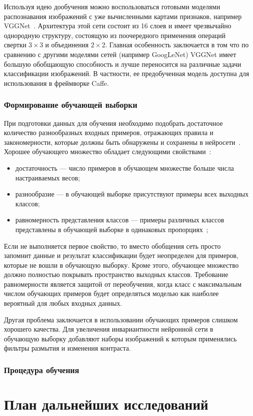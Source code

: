 \documentclass[a4paper,14pt]{extarticle} %
\begin{document}
Используя идею дообучения можно воспользоваться готовыми моделями распознавания изображений с уже вычисленными картами признаков, например VGGNet~\cite{VGGNet}. Архитектура этой сети состоит из 16 слоев и имеет чрезвычайно однородную структуру, состоящую из поочередного применения операций свертки $3 \times 3$ и объединения $2 \times 2$. Главная особенность заключается в том что по сравнению с другими моделями сетей (например GoogLeNet) VGGNet имеет большую обобщающую способность и лучше переносится на различные задачи классификации изображений. В частности, ее предобученная модель доступна для использования в фреймворке Caffe.

\subsubsection{Формирование обучающей выборки}
\hspace{\parindent} При подготовки данных для обучения необходимо подобрать достаточное количество разнообразных входных примеров, отражающих правила и закономерности, которые должны быть обнаружены и сохранены в нейросети~\cite{TrainingData3}. Хорошее обучающего множество обладает следующими свойствами~\cite{TrainingData}:

\begin{itemize}
\item достаточность --- число примеров в обучающем множестве больше числа настраиваемых весов;
\item разнообразие --- в обучающей выборке присутствуют примеры всех выходных классов; 
\item равномерность представления классов --- примеры различных классов представлены в обучающей выборке в одинаковых пропорциях~\cite{TrainingData2}; 
\end{itemize}

Если не выполняется первое свойство, то вместо обобщения сеть просто запомнит данные и результат классификации будет неопределен для примеров, которые не вошли в обучающую выборку. Кроме этого, обучающее множество должно полностью покрывать пространство выходных классов. Требование равномерности является защитой от переобучения, когда класс с максимальным числом обучающих примеров будет определяться моделью как наиболее вероятный для любых входных данных.

Другая проблема заключается в использовании обучающих примеров слишком хорошего качества. Для увеличения инвариантности нейронной сети в обучающую выборку добавляют наборы изображений к которым применялись фильтры размытия и изменения контраста.

\subsubsection{Процедура обучения}
\hspace{\parindent}

\section{План дальнейших исследований}
\hspace{\parindent} 

%
\newpage
\begin{flushleft}
\end{flushleft}
\end{document}
